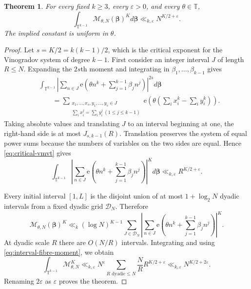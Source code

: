 \documentclass[11pt,reqno]{amsart}
\numberwithin{equation}{section}
\newtheorem{theorem}{Theorem}[section]
\theoremstyle{definition}
\theoremstyle{remark}
\newcommand{\T}{\mathbb T}
\newcommand{\e}{\mathrm e}
\newcommand{\cD}{\mathcal D}
\newcommand{\cM}{\mathcal M}
\begin{document}
\begin{theorem}\label{thm:maximal-fibre-moment}
For every fixed $k\ge3$, every $\varepsilon>0$, and every $\theta\in\T$,
\begin{equation}\label{eq:maximal-fibre-moment}
  \int_{\T^{k-1}}
  \cM_{\theta,N}(\boldsymbol\beta)^K
  d\boldsymbol\beta
  \ll_{k,\varepsilon}
  N^{K/2+\varepsilon}.
\end{equation}
The implied constant is uniform in $\theta$.
\end{theorem}

\begin{proof}
Let $s=K/2=k(k-1)/2$, which is the critical exponent for the Vinogradov system of degree $k-1$.  First consider an integer interval $J$ of length $R\le N$.  Expanding the $2s$th moment and integrating in $\beta_1,\ldots,\beta_{k-1}$ gives
\begin{align*}
  &\int_{\T^{k-1}}
  \left|\sum_{n\in J}
  \e\left(\theta n^k+\sum_{j=1}^{k-1}\beta_jn^j\right)
  \right|^{2s}
  d\boldsymbol\beta\\
  &\qquad=
  \sum_{\substack{x_1,\ldots,x_s,y_1,\ldots,y_s\in J\\
  \sum_i x_i^j=\sum_i y_i^j\ (1\le j\le k-1)}}
  \e\left(\theta\left(\sum_i x_i^k-\sum_i y_i^k\right)\right).
\end{align*}
Taking absolute values and translating $J$ to an interval beginning at one, the right-hand side is at most $J_{s,k-1}(R)$.  Translation preserves the system of equal power sums because the numbers of variables on the two sides are equal.  Hence \eqref{eq:critical-vmvt} gives
\begin{equation}\label{eq:interval-fibre-moment}
  \int_{\T^{k-1}}
  \left|\sum_{n\in J}
  \e\left(\theta n^k+\sum_{j=1}^{k-1}\beta_jn^j\right)
  \right|^{K}
  d\boldsymbol\beta
  \ll_{k,\varepsilon}R^{K/2+\varepsilon}.
\end{equation}

Every initial interval $[1,L]$ is the disjoint union of at most $1+\log_2N$ dyadic intervals from a fixed dyadic grid $\cD_N$.  Therefore
\[
  \cM_{\theta,N}(\boldsymbol\beta)^K
  \ll_k
  (\log N)^{K-1}
  \sum_{J\in\cD_N}
  \left|\sum_{n\in J}
  \e\left(\theta n^k+\sum_{j=1}^{k-1}\beta_jn^j\right)
  \right|^K.
\]
At dyadic scale $R$ there are $O(N/R)$ intervals.  Integrating and using \eqref{eq:interval-fibre-moment}, we obtain
\[
  \int_{\T^{k-1}}\cM_{\theta,N}^K
  \ll_{k,\varepsilon}
  N^\varepsilon
  \sum_{R\text{ dyadic}\le N}
  \frac NR R^{K/2+\varepsilon}
  \ll_{k,\varepsilon}N^{K/2+2\varepsilon}.
\]
Renaming $2\varepsilon$ as $\varepsilon$ proves the theorem.
\end{proof}
\end{document}
